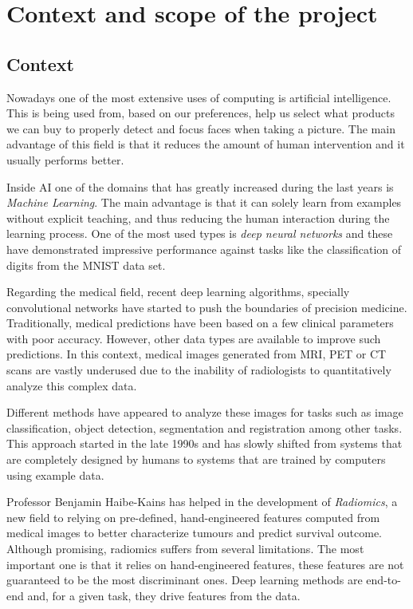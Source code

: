 
\section{Context and scope of the project}
\subsection{Context}

Nowadays one of the most extensive uses of computing is artificial intelligence. This is being
used from, based on our preferences, help us select what products we can buy to properly detect
and focus faces when taking a picture. The main advantage of this field is that it reduces the
amount of human intervention and it usually performs better.

Inside AI one of the domains that has greatly increased during the last years is 
\emph{Machine Learning}. The main advantage is that it can solely learn from examples without 
explicit teaching, and thus reducing the human interaction during the learning process. One of the 
most used types is \emph{deep neural networks} and these have demonstrated impressive performance 
against tasks like the classification of digits from the MNIST data set.
~\cites{neural:MNIST}{neural:empirical-evaluation-deep-architectures}

Regarding the medical field, recent deep learning algorithms, specially convolutional networks 
have started to push the boundaries of precision medicine. 
Traditionally, medical predictions have been based on a few clinical parameters with poor accuracy.
However, other data types are available to improve such predictions. In this context, medical
images generated from MRI, PET or CT scans are vastly underused due to the inability of radiologists
to quantitatively analyze this complex data.

Different methods have appeared to analyze these images for tasks such as
image classification, object detection, segmentation and registration among other tasks. This
approach started in the late 1990s and has slowly shifted from systems that are completely designed
by humans to systems that are trained by computers using example data. 
~\cite{medical:survey-deep-learning}

Professor Benjamin Haibe-Kains has helped in the development of \emph{Radiomics}, a new field to
relying on pre-defined, hand-engineered features computed from medical images to better 
characterize tumours and predict survival outcome. Although promising, radiomics suffers from 
several limitations. The most important one is that it relies on hand-engineered features,
these features are not guaranteed to be the most discriminant ones. Deep learning methods
are end-to-end and, for a given task, they drive features from the data.
~\cite{medical:radiomics-ML-classifiers}

